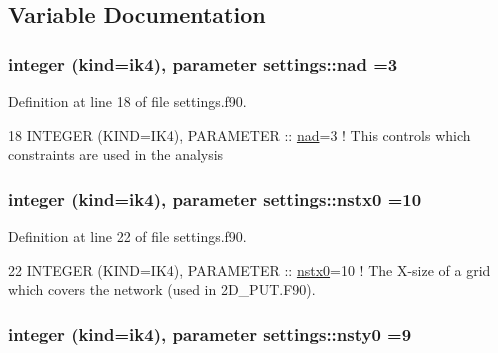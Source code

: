 \subsection{Variable Documentation}
\subsubsection[{\texorpdfstring{nad}{nad}}]{\setlength{\rightskip}{0pt plus 5cm}integer (kind=ik4), parameter settings\+::nad =3}\hypertarget{namespacesettings_a4f624be133b88a44c8976b47b85e8eec}{}\label{namespacesettings_a4f624be133b88a44c8976b47b85e8eec}


Definition at line 18 of file settings.\+f90.


\begin{DoxyCode}
18 \textcolor{keywordtype}{INTEGER (KIND=IK4)}, \textcolor{keywordtype}{PARAMETER}   :: \hyperlink{namespacesettings_a4f624be133b88a44c8976b47b85e8eec}{nad}=3                    \textcolor{comment}{! This controls which constraints are used
       in the analysis}
\end{DoxyCode}
\subsubsection[{\texorpdfstring{nstx0}{nstx0}}]{\setlength{\rightskip}{0pt plus 5cm}integer (kind=ik4), parameter settings\+::nstx0 =10}\hypertarget{namespacesettings_a45f66b2df6e7509477bcf669702044a8}{}\label{namespacesettings_a45f66b2df6e7509477bcf669702044a8}


Definition at line 22 of file settings.\+f90.


\begin{DoxyCode}
22 \textcolor{keywordtype}{INTEGER (KIND=IK4)}, \textcolor{keywordtype}{PARAMETER}   :: \hyperlink{namespacesettings_a45f66b2df6e7509477bcf669702044a8}{nstx0}=10                 \textcolor{comment}{! The X-size of a grid which covers the
       network (used in 2D\_PUT.F90).}
\end{DoxyCode}
\subsubsection[{\texorpdfstring{nsty0}{nsty0}}]{\setlength{\rightskip}{0pt plus 5cm}integer (kind=ik4), parameter settings\+::nsty0 =9}\hypertarget{namespacesettings_a3989615b44f5121ea2e8761d6abc24e1}{}\label{namespacesettings_a3989615b44f5121ea2e8761d6abc24e1}


